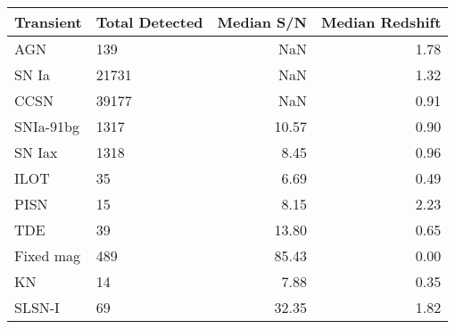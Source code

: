 \begin{tabular}{llrr}
\toprule
Transient & Total Detected & Median S/N & Median Redshift \\
\midrule
AGN & 139 & NaN & 1.78 \\
SN Ia & 21731 & NaN & 1.32 \\
CCSN & 39177 & NaN & 0.91 \\
SNIa-91bg & 1317 & 10.57 & 0.90 \\
SN Iax & 1318 & 8.45 & 0.96 \\
ILOT & 35 & 6.69 & 0.49 \\
PISN & 15 & 8.15 & 2.23 \\
TDE & 39 & 13.80 & 0.65 \\
Fixed mag & 489 & 85.43 & 0.00 \\
KN & 14 & 7.88 & 0.35 \\
SLSN-I & 69 & 32.35 & 1.82 \\
\bottomrule
\end{tabular}
